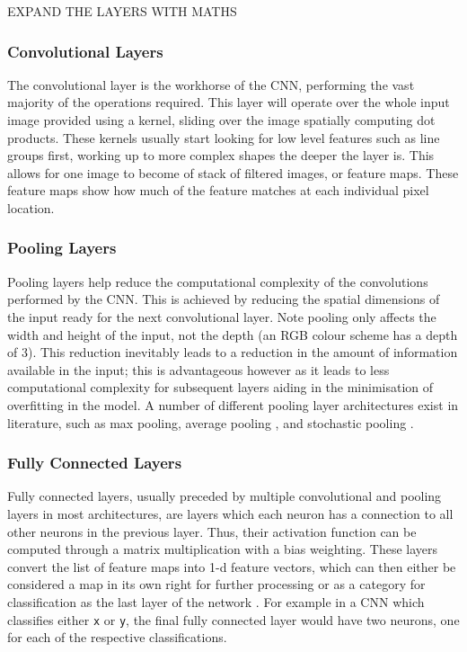 EXPAND THE LAYERS WITH MATHS
\subsubsection{Convolutional Layers}\label{ch:Background,sec:CNN,sub:CNN,subsub:convolution}
The convolutional layer is the workhorse of the CNN, performing the vast majority of the operations required. This layer will operate over the whole input image provided using a kernel, sliding over the image spatially computing dot products. These kernels usually start looking for low level features such as line groups first, working up to more complex shapes the deeper the layer is. This allows for one image to become of stack of filtered images, or feature maps. These feature maps show how much of the feature matches at each individual pixel location. 

\subsubsection{Pooling Layers}\label{ch:Background,sec:CNN,sub:CNN,subsubsec:pooling}
Pooling layers help reduce the computational complexity of the convolutions performed by the CNN. This is achieved by reducing the spatial dimensions of the input ready for the next convolutional layer. Note pooling only affects the width and height of the input, not the depth (an RGB colour scheme has a depth of 3). This reduction inevitably leads to a reduction in the amount of information available in the input; this is advantageous however as it leads to less computational complexity for subsequent layers aiding in the minimisation of overfitting in the model. A number of different pooling layer architectures exist in literature, such as max pooling, average pooling \cite{boureau_theoretical_2010}, and stochastic pooling \cite{zeiler_stochastic_2013}.

\subsubsection{Fully Connected Layers}\label{ch:Background,sec:CNN,sub:CNN,subsubsec:fullyConnected}
Fully connected layers, usually preceded by multiple convolutional and pooling layers in most architectures, are layers which each neuron has a connection to all other neurons in the previous layer. Thus, their activation function can be computed through a matrix multiplication with a bias weighting. These layers convert the list of feature maps into 1-d feature vectors, which can then either be considered a map in its own right for further processing \cite{krizhevsky_imagenet_2012} or as a category for classification as the last layer of the network \cite{girshick_rich_2014}. For example in a CNN which classifies either \texttt{x} or \texttt{y}, the final fully connected layer would have two neurons, one for each of the respective classifications. 

